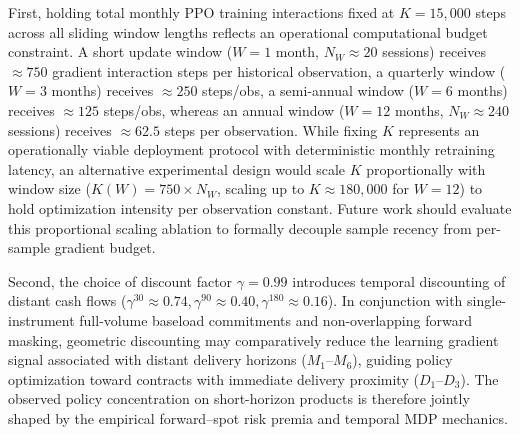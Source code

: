 First, holding total monthly PPO training interactions fixed at $K = 15{,}000$ steps across all sliding window lengths reflects an operational computational budget constraint. A short update window ($W=1$ month, $N_W \approx 20$ sessions) receives $\approx 750$ gradient interaction steps per historical observation, a quarterly window ($W=3$ months) receives $\approx 250$ steps/obs, a semi-annual window ($W=6$ months) receives $\approx 125$ steps/obs, whereas an annual window ($W=12$ months, $N_W \approx 240$ sessions) receives $\approx 62.5$ steps per observation. While fixing $K$ represents an operationally viable deployment protocol with deterministic monthly retraining latency, an alternative experimental design would scale $K$ proportionally with window size ($K(W) = 750 \times N_W$, scaling up to $K \approx 180{,}000$ for $W=12$) to hold optimization intensity per observation constant. Future work should evaluate this proportional scaling ablation to formally decouple sample recency from per-sample gradient budget.

Second, the choice of discount factor $\gamma = 0.99$ introduces temporal discounting of distant cash flows ($\gamma^{30} \approx 0.74, \gamma^{90} \approx 0.40, \gamma^{180} \approx 0.16$). In conjunction with single-instrument full-volume baseload commitments and non-overlapping forward masking, geometric discounting may comparatively reduce the learning gradient signal associated with distant delivery horizons ($M_1$--$M_6$), guiding policy optimization toward contracts with immediate delivery proximity ($D_1$--$D_3$). The observed policy concentration on short-horizon products is therefore jointly shaped by the empirical forward--spot risk premia and temporal MDP mechanics.

